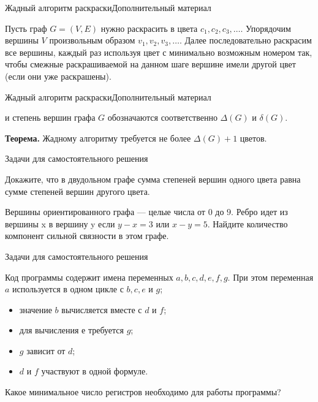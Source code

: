\begin{frame}{Жадный алгоритм раскраски}{Дополнительный материал}

 {}

Пусть граф $G=(V,E)$ нужно раскрасить в цвета $c_1,c_2,c_3,\ldots$.
Упорядочим вершины $V$ произвольным образом $v_1,v_2,v_3,\ldots$. Далее последовательно раскрасим все вершины, каждый раз используя цвет с минимально возможным номером так, чтобы смежные раскрашиваемой на данном шаге вершине имели другой цвет (если они уже раскрашены).


\end{frame}

\begin{frame}{Жадный алгоритм раскраски}{Дополнительный материал}

 {} и  степень вершин графа $G$ обозначаются соответственно $\Delta(G)$ и $\delta(G)$.

\spc

{\bf Теорема.} Жадному алгоритму требуется не более $\Delta(G)+1$ цветов.

\end{frame}


\begin{frame}{Задачи для самостоятельного решения}

\z Докажите, что в двудольном графе сумма степеней вершин одного цвета равна сумме степеней вершин другого цвета.

\z Вершины ориентированного графа --- целые числа от $0$ до $9$. Ребро
идет из вершины x в вершину y если $y - x = 3$ или $x - y = 5$. Найдите
количество компонент сильной связности в этом графе.

\end{frame}


\begin{frame}{Задачи для самостоятельного решения}

\z Код программы содержит имена переменных $a,b,c,d,e,f,g$. При этом переменная $a$ используется в одном цикле с $b,c,e$ и $g$;
\begin{itemize}
\item значение $b$ вычисляется вместе с $d$ и $f$;

\item для вычисления $е$ требуется $g$;

\item $g$ зависит от $d$;

\item $d$ и $f$ участвуют в одной формуле.
\end{itemize}

Какое минимальное число регистров необходимо для работы программы?

\end{frame}


